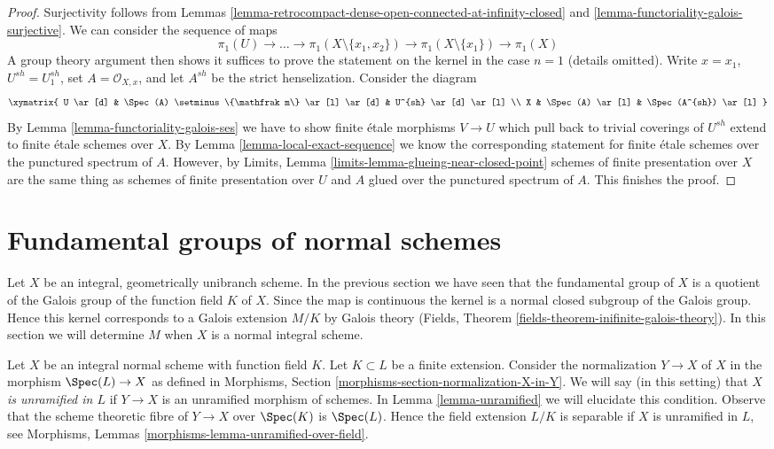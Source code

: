 \begin{proof}
Surjectivity follows from
Lemmas \ref{lemma-retrocompact-dense-open-connected-at-infinity-closed} and
\ref{lemma-functoriality-galois-surjective}.
We can consider the sequence of maps
$$
\pi_1(U)  \to \ldots \to
\pi_1(X \setminus \{x_1, x_2\}) \to \pi_1(X \setminus \{x_1\}) \to \pi_1(X)
$$
A group theory argument then shows it suffices to prove the statement on the
kernel in the case $n = 1$ (details omitted). Write
$x = x_1$, $U^{sh} = U_1^{sh}$,
set $A = \mathcal{O}_{X, x}$, and let $A^{sh}$ be the strict henselization.
Consider the diagram
$$
\xymatrix{
U \ar[d] &
\Spec(A) \setminus \{\mathfrak m\} \ar[l] \ar[d] &
U^{sh} \ar[d] \ar[l] \\
X & \Spec(A) \ar[l] & \Spec(A^{sh}) \ar[l]
}
$$
By Lemma \ref{lemma-functoriality-galois-ses}
we have to show finite \'etale morphisms
$V \to U$ which pull back to trivial coverings of $U^{sh}$
extend to finite \'etale schemes over $X$.
By Lemma \ref{lemma-local-exact-sequence}
we know the corresponding statement
for finite \'etale schemes over the punctured spectrum of $A$.
However, by Limits, Lemma \ref{limits-lemma-glueing-near-closed-point}
schemes of finite presentation over $X$ are the same thing as
schemes of finite presentation over $U$ and $A$ glued over
the punctured spectrum of $A$. This finishes the proof.
\end{proof}









\section{Fundamental groups of normal schemes}
\label{section-normal}

\noindent
Let $X$ be an integral, geometrically unibranch scheme. In the previous section
we have seen that the fundamental group of $X$ is a quotient of the
Galois group of the function field $K$ of $X$. Since the map is continuous
the kernel is a normal closed subgroup of the Galois group. Hence this kernel
corresponds to a Galois extension $M/K$ by Galois theory
(Fields, Theorem \ref{fields-theorem-inifinite-galois-theory}).
In this section we will determine $M$ when $X$ is a normal integral scheme.

\medskip\noindent
Let $X$ be an integral normal scheme with function field $K$.
Let $K \subset L$ be a finite extension. Consider the normalization
$Y \to X$ of $X$ in the morphism $\Spec(L) \to X$ as defined in
Morphisms, Section \ref{morphisms-section-normalization-X-in-Y}.
We will say (in this setting) that {\it $X$ is unramified in $L$}
if $Y \to X$ is an unramified morphism of schemes. In
Lemma \ref{lemma-unramified} we will elucidate this condition.
Observe that the scheme theoretic fibre of $Y \to X$ over $\Spec(K)$
is $\Spec(L)$. Hence the field extension $L/K$ is separable if $X$ is
unramified in $L$, see
Morphisms, Lemmas \ref{morphisms-lemma-unramified-over-field}.

